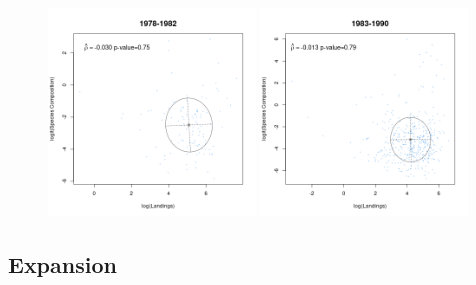 \documentclass[12pt]{article}
\begin{document}
%
\begin{figure}[h!]
\centering
\includegraphics[width=0.49\textwidth]{./quickScripts/19781982Joint.png}
\includegraphics[width=0.49\textwidth]{./quickScripts/19831990Joint.png}
\end{figure}

%
\subsection{Expansion}
%
\end{document}
